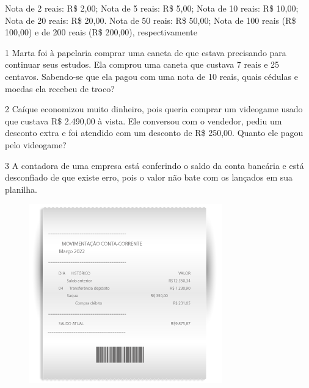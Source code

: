 {Nota de 2 reais: R\$ 2,00; Nota de 5 reais: R\$ 5,00; Nota de 10 reais: R\$ 10,00; Nota de 20 reais: R\$ 20,00. Nota de 50 reais: R\$ 50,00; Nota de 100 reais (R\$ 100,00) e de 200 reais (R\$ 200,00), respectivamente
}

\pagebreak


\num{1} Marta foi à papelaria comprar uma caneta de que estava precisando para continuar seus estudos. Ela comprou uma caneta que custava 7 reais e 25
centavos. Sabendo-se que ela pagou com uma nota de 10 reais, quais
cédulas e moedas ela recebeu de troco?


\num{2} Caíque economizou muito dinheiro, pois queria comprar um videogame
usado que custava R\$ 2.490,00 à vista. Ele conversou com o vendedor, pediu um desconto extra e foi atendido com um desconto de R\$ 250,00.
Quanto ele pagou pelo videogame?

\bigskip
\bigskip
\bigskip


\num{3} A contadora de uma empresa está conferindo o saldo da conta
bancária e está desconfiado de que existe erro, pois o valor não bate com
os lançados em sua planilha.

\begin{figure}[htpb!]
\centering
\includegraphics[width=.5\textwidth]{../ilustracoes/MAT5/SAEB_5ANO_MAT_figura49.png}
\end{figure}


